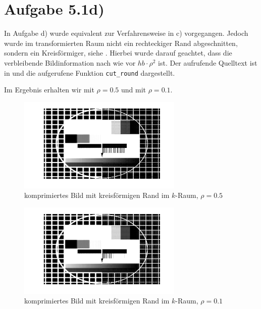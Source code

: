 \section*{Aufgabe 5.1d)}

In Aufgabe d) wurde equivalent zur Verfahrensweise in c) vorgegangen.
Jedoch wurde im transformierten Raum nicht ein rechteckiger Rand abgeschnitten,
sondern ein Kreisförmiger, siehe . Hierbei wurde darauf geachtet, dass die verbleibende
Bildinformation nach wie vor $hb\cdot ρ^2$ ist. Der aufrufende Quelltext ist in  und 
die aufgerufene Funktion \texttt{cut\_round} dargestellt.




Im Ergebnis erhalten wir  mit $ρ=0.5$ und  mit $ρ=0.1$.

\begin{figure}[htb]
\centering
  \includegraphics[width=0.7\textwidth,keepaspectratio]{../tmp/eins_c_0_5}
  \caption{komprimiertes Bild mit kreisförmigen Rand im $k$-Raum, $ρ=0.5$}
  \label{fig:1d5}
\end{figure}

\begin{figure}[htb]
\centering
  \includegraphics[width=0.7\textwidth,keepaspectratio]{../tmp/eins_c_0_1}
  \caption{komprimiertes Bild mit kreisförmigen Rand im $k$-Raum, $ρ=0.1$}
  \label{fig:1d1}
\end{figure}

